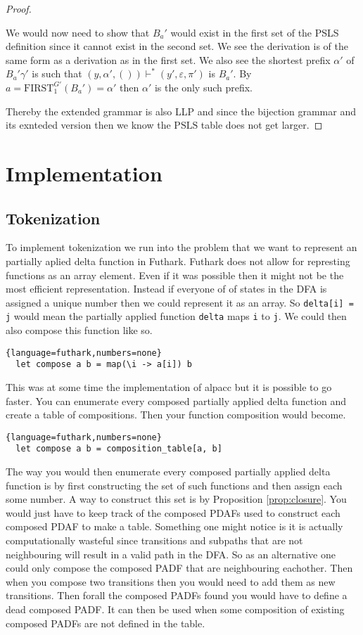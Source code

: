 \documentclass[a4paper,12pt]{article}
\newcommand\PSLS{\text{PSLS}}
\theoremstyle{definition}
\begin{document}
\begin{proof}
\begin{itemize}
    We would now need to show that $B_a'$ would exist in the first set of the PSLS definition since it cannot exist in the second set. We see the derivation is of the same form as a derivation as in the first set. We also see the shortest prefix $\alpha'$ of $B_a'\gamma'$ is such that $(y, \alpha', ()) \vdash^* (y', \varepsilon, \pi')$ is $B_a'$. By $a = \text{FIRST}^{G'}_1(B_a') = \alpha'$ then $\alpha'$ is the only such prefix.
  \end{itemize}
  Thereby the extended grammar is also LLP and since the bijection grammar and its exnteded version then we know the $\PSLS$ table does not get larger.
\end{proof}

\section{Implementation}
\subsection{Tokenization}
To implement tokenization we run into the problem that we want to represent an partially aplied delta function in Futhark. Futhark does not allow for represting functions as an array element. Even if it was possible then it might not be the most efficient representation. Instead if everyone of of states in the DFA is assigned a unique number then we could represent it as an array. So \texttt{delta[i] = j} would mean the partially applied function \texttt{delta} maps \texttt{i} to \texttt{j}. We could then also compose this function like so.
\begin{lstlisting}{language=futhark,numbers=none}
  let compose a b = map(\i -> a[i]) b
\end{lstlisting}
This was at some time the implementation of alpacc but it is possible to go faster. You can enumerate every composed partially applied delta function and create a table of compositions. Then your function composition would become.
\begin{lstlisting}{language=futhark,numbers=none}
  let compose a b = composition_table[a, b]
\end{lstlisting}
The way you would then enumerate every composed partially applied delta function is by first constructing the set of such functions and then assign each some number. A way to construct this set is by Proposition \ref{prop:closure}. You would just have to keep track of the composed PDAFs used to construct each composed PDAF to make a table. Something one might notice is it is actually computationally wasteful since transitions and subpaths that are not neighbouring will result in a valid path in the DFA. So as an alternative one could only compose the composed PADF that are neighbouring eachother. Then when you compose two transitions then you would need to add them as new transitions. Then forall the composed PADFs found you would have to define a dead composed PADF. It can then be used when some composition of existing composed PADFs are not defined in the table.
\end{document}
